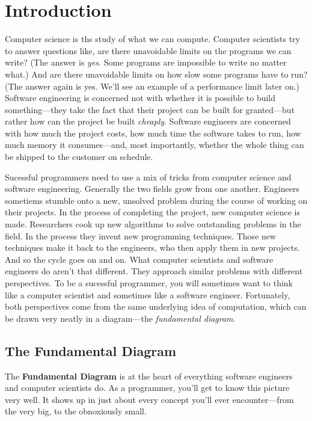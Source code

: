 \setchapterpreamble[u]{\margintoc}
\chapter{Introduction}

Computer science is ths study of what we can compute. Computer scientists try to answer questions like, are there unavoidable limits on the programs we can write? (The answer is \emph{yes}. Some programs are impossible to write no matter what.) And are there unavoidable limits on how slow some programs have to run? (The answer again is yes. We'll see an example of a performance limit later on.) Software engineering is concerned not with whether it is possible to build something---they take the fact that their project can be built for granted---but rather how can the project be built \emph{cheaply}. Software engineers are concerned with how much the project costs, how much time the software takes to run, how much memory it consumes---and, most importantly, whether the whole thing can be shipped to the customer on schedule.

Sucessful programmers need to use a mix of tricks from computer science and software engineering. Generally the two fields grow from one another. Engineers sometiems stumble onto a new, unsolved problem during the course of working on their projects. In the process of completing the project, new computer science is made. Researchers cook up new algorithms to solve outstanding problems in the field. In the process they invent new programming techniques. Those new techniques make it back to the engineers, who then apply them in new projects. And so the cycle goes on and on. What computer scientists and software engineers do aren't that different. They approach similar problems with different perspectives. To be a sucessful programmer, you will sometimes want to think like a computer scientist and sometimes like a software engineer. Fortunately, both perspectives come from the same underlying idea of computation, which can be drawn very neatly in a diagram---the \emph{fundamental diagram}.

\section{The Fundamental Diagram}
The \textbf{Fundamental Diagram} is at the heart of everything software engineers and computer scientists do. As a programmer, you'll get to know this picture very well. It shows up in just about every concept you'll ever encounter---from the very big, to the obnoxiously small.

